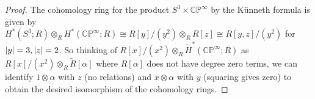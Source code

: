 \documentclass[11pt]{article}
\begin{document}
\begin{enumerate}
\begin{proof}
        The cohomology ring for the product $S^3\times\mathbb{CP}^\infty$ by the K\"unneth formula is given by $H^\ast(S^3;R)\otimes_R H^\ast(\mathbb{CP}^\infty;R)\cong R[y]/(y^2)\otimes_R R[z]\cong R[y,z]/(y^2)$ for $\abs{y}=3,\abs{z}=2$. So thinking of $R[x]/(x^2)\otimes_R \tilde H^\ast(\mathbb{CP}^\infty;R)$ as $R[x]/(x^2)\otimes_R \tilde R[\alpha]$ where $R[\alpha]$ does not have degree zero terms, we can identify $1\otimes \alpha$ with $z$ (no relations) and $x\otimes \alpha$ with $y$ (squaring gives zero) to obtain the desired isomorphism of the cohomology rings. 
    \end{proof}
\end{enumerate}
\end{document}
